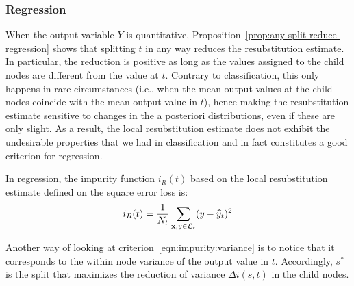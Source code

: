 \subsubsection{Regression}
\label{sec:3:criteria:regression}

When the output variable $Y$ is quantitative, Proposition~\ref{prop:any-split-reduce-regression}
shows that splitting $t$ in any way reduces the
resubstitution estimate. In particular, the reduction is positive as long as
the values assigned to the child nodes are different from the value at $t$.
Contrary to classification, this only happens in rare circumstances (i.e., when
the mean output values at the child nodes coincide with the mean output value
in $t$), hence making the resubstitution estimate sensitive to changes in the a
posteriori distributions, even if these are only slight.  As a result, the
local resubstitution estimate does not exhibit the undesirable properties that
we had in classification and in fact constitutes a good criterion for
regression.

\begin{definition}
In regression, the impurity function $i_R(t)$ based on the local resubstitution estimate
defined on the square error loss is:
\begin{equation}\label{eqn:impurity:variance}
i_R(t) = \frac{1}{N_t} \sum_{\mathbf{x}, y \in {\cal L}_t} (y - \widehat{y}_t)^2
\end{equation}
\end{definition}

Another way of looking at criterion~\ref{eqn:impurity:variance} is to notice
that it corresponds to the within node variance of the output value in $t$.
Accordingly, $s^*$ is the split that maximizes the reduction of variance
$\Delta i(s, t)$ in the child nodes.

